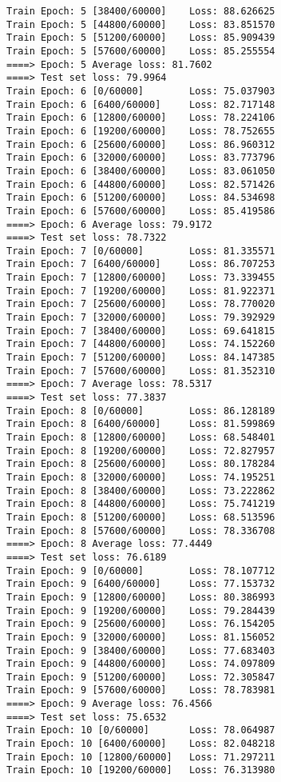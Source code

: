 \documentclass[11pt]{article}
\begin{document}
\begin{Verbatim}[commandchars=\\\{\}]
Train Epoch: 5 [38400/60000]    Loss: 88.626625
Train Epoch: 5 [44800/60000]    Loss: 83.851570
Train Epoch: 5 [51200/60000]    Loss: 85.909439
Train Epoch: 5 [57600/60000]    Loss: 85.255554
====> Epoch: 5 Average loss: 81.7602
====> Test set loss: 79.9964
Train Epoch: 6 [0/60000]        Loss: 75.037903
Train Epoch: 6 [6400/60000]     Loss: 82.717148
Train Epoch: 6 [12800/60000]    Loss: 78.224106
Train Epoch: 6 [19200/60000]    Loss: 78.752655
Train Epoch: 6 [25600/60000]    Loss: 86.960312
Train Epoch: 6 [32000/60000]    Loss: 83.773796
Train Epoch: 6 [38400/60000]    Loss: 83.061050
Train Epoch: 6 [44800/60000]    Loss: 82.571426
Train Epoch: 6 [51200/60000]    Loss: 84.534698
Train Epoch: 6 [57600/60000]    Loss: 85.419586
====> Epoch: 6 Average loss: 79.9172
====> Test set loss: 78.7322
Train Epoch: 7 [0/60000]        Loss: 81.335571
Train Epoch: 7 [6400/60000]     Loss: 86.707253
Train Epoch: 7 [12800/60000]    Loss: 73.339455
Train Epoch: 7 [19200/60000]    Loss: 81.922371
Train Epoch: 7 [25600/60000]    Loss: 78.770020
Train Epoch: 7 [32000/60000]    Loss: 79.392929
Train Epoch: 7 [38400/60000]    Loss: 69.641815
Train Epoch: 7 [44800/60000]    Loss: 74.152260
Train Epoch: 7 [51200/60000]    Loss: 84.147385
Train Epoch: 7 [57600/60000]    Loss: 81.352310
====> Epoch: 7 Average loss: 78.5317
====> Test set loss: 77.3837
Train Epoch: 8 [0/60000]        Loss: 86.128189
Train Epoch: 8 [6400/60000]     Loss: 81.599869
Train Epoch: 8 [12800/60000]    Loss: 68.548401
Train Epoch: 8 [19200/60000]    Loss: 72.827957
Train Epoch: 8 [25600/60000]    Loss: 80.178284
Train Epoch: 8 [32000/60000]    Loss: 74.195251
Train Epoch: 8 [38400/60000]    Loss: 73.222862
Train Epoch: 8 [44800/60000]    Loss: 75.741219
Train Epoch: 8 [51200/60000]    Loss: 68.513596
Train Epoch: 8 [57600/60000]    Loss: 78.336708
====> Epoch: 8 Average loss: 77.4449
====> Test set loss: 76.6189
Train Epoch: 9 [0/60000]        Loss: 78.107712
Train Epoch: 9 [6400/60000]     Loss: 77.153732
Train Epoch: 9 [12800/60000]    Loss: 80.386993
Train Epoch: 9 [19200/60000]    Loss: 79.284439
Train Epoch: 9 [25600/60000]    Loss: 76.154205
Train Epoch: 9 [32000/60000]    Loss: 81.156052
Train Epoch: 9 [38400/60000]    Loss: 77.683403
Train Epoch: 9 [44800/60000]    Loss: 74.097809
Train Epoch: 9 [51200/60000]    Loss: 72.305847
Train Epoch: 9 [57600/60000]    Loss: 78.783981
====> Epoch: 9 Average loss: 76.4566
====> Test set loss: 75.6532
Train Epoch: 10 [0/60000]       Loss: 78.064987
Train Epoch: 10 [6400/60000]    Loss: 82.048218
Train Epoch: 10 [12800/60000]   Loss: 71.297211
Train Epoch: 10 [19200/60000]   Loss: 76.313980

\end{Verbatim}
\end{document}
